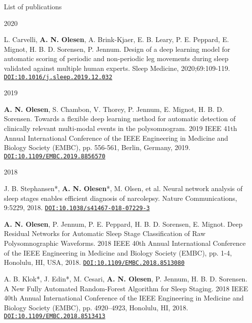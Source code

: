 \documentclass{resume} %
\begin{document}
\begin{rSection}{List of publications}
\begin{rSubsection}{2020}{}{}{}
	    \item L. Carvelli, \textbf{A. N. Olesen}, A. Brink-Kjaer, E. B. Leary, P. E. Peppard, E. Mignot, H. B. D. Sorensen, P. Jennum. Design of a deep learning model for automatic scoring of periodic and non-periodic leg movements during sleep validated against multiple human experts. Sleep Medicine, 2020;69:109-119. \href{https://doi.org/10.1016/j.sleep.2019.12.032}{\texttt{DOI:10.1016/j.sleep.2019.12.032}}
	\end{rSubsection}
    
	\begin{rSubsection}{2019}{}{}{}
	    \item \textbf{A. N. Olesen}, S. Chambon, V. Thorey, P. Jennum, E. Mignot, H. B. D. Sorensen. Towards a flexible deep learning method for automatic detection of clinically relevant multi-modal events in the polysomnogram. 2019 IEEE 41th Annual International Conference of the IEEE Engineering in Medicine and Biology Society (EMBC), pp. 556-561, Berlin, Germany, 2019. \href{https://doi.org/10.1109/EMBC.2019.8856570}{\texttt{DOI:10.1109/EMBC.2019.8856570}}
	\end{rSubsection}
	
	\begin{rSubsection}{2018}{}{}{}
	    \item J. B. Stephansen\mbox{*}, \textbf{A. N. Olesen}\mbox{*}, M. Olsen, et al. Neural network analysis of sleep stages enables efficient diagnosis of narcolepsy. Nature Communications, 9:5229, 2018. \href{https://doi.org/10.1038/s41467-018-07229-3}{\texttt{DOI:10.1038/s41467-018-07229-3}}
	    
	    \item \textbf{A. N. Olesen}, P. Jennum, P. E. Peppard, H. B. D. Sorensen, E. Mignot. Deep Residual Networks for Automatic Sleep Stage Classification of Raw Polysomnographic Waveforms. 2018 IEEE 40th Annual International Conference of the IEEE Engineering in Medicine and Biology Society (EMBC), pp. 1-4, Honolulu, HI, USA, 2018. \href{https://doi.org/10.1109/EMBC.2018.8513080}{\texttt{DOI:10.1109/EMBC.2018.8513080}}
	    
	    \item A. B. Klok\mbox{*}, J. Edin\mbox{*}, M. Cesari, \textbf{A. N. Olesen}, P. Jennum, H. B. D. Sorensen. A New Fully Automated Random-Forest Algorithm for Sleep Staging. 2018 IEEE 40th Annual International Conference of the IEEE Engineering in Medicine and Biology Society (EMBC), pp. 4920–4923, Honolulu, HI, 2018. \href{https://doi.org/10.1109/EMBC.2018.8513413}{\texttt{DOI:10.1109/EMBC.2018.8513413}}
	    

\end{rSubsection}
\end{rSection}
\end{document}
